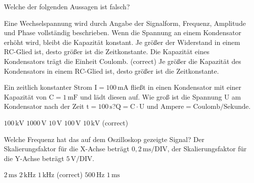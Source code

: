 \documentclass[11pt]{exam}
\begin{document}
\setlength{\voffset}{-0.5in}
\setlength{\headsep}{5pt}

\hspace{2mm}
 \hspace{5mm}
\vspace{4mm}

\begin{questions}

\question Welche der folgenden Aussagen ist falsch?

\begin{choices}
	\choice Eine Wechselspannung wird durch Angabe der Signalform, Frequenz, Amplitude und Phase vollständig beschrieben.
	\choice Wenn die Spannung an einem Kondensator erhöht wird, bleibt die Kapazität konstant.
	\choice Je größer der Widerstand in einem RC-Glied ist, desto größer ist die Zeitkonstante.
	\choice Die Kapazität eines Kondensators trägt die Einheit Coulomb. (correct)
	\choice Je größer die Kapazität des Kondensators in einem RC-Glied ist, desto größer ist die Zeitkonstante.
\end{choices}

\vspace{3mm}\question Ein zeitlich konstanter Strom \(\mathrm{I=100\,mA}\) fließt in einen Kondensator mit einer Kapazität von \(\mathrm{C=1\,mF}\) und lädt diesen auf. Wie groß ist die Spannung \(\mathrm{U}\) am Kondensator nach der Zeit \(\mathrm{t=100\,s}\)?\(\mathrm{Q=C \cdot U}\) und \(\mathrm{Ampere=Coulomb/Sekunde}\).

\begin{choices}
	\choice \(\mathrm{100\,kV}\)
	\choice \(\mathrm{1000\,V}\)
	\choice \(\mathrm{10\,V}\)
	\choice \(\mathrm{100\,V}\)
	\choice \(\mathrm{10\,kV}\) (correct)
\end{choices}

\vspace{3mm}\question Welche Frequenz hat das auf dem Oszilloskop gezeigte Signal? Der Skalierungsfaktor für die X-Achse beträgt \(\mathrm{0,2\,ms/DIV}\), der Skalierungsfaktor für die Y-Achse beträgt \(\mathrm{5\,V/DIV}\).

\begin{choices}
	\choice \(\mathrm{2\,ms}\)
	\choice \(\mathrm{2\,kHz}\)
	\choice \(\mathrm{1\,kHz}\) (correct)
	\choice \(\mathrm{500\,Hz}\)
	\choice \(\mathrm{1\,ms}\)
\end{choices}


\end{questions}
\end{document}
